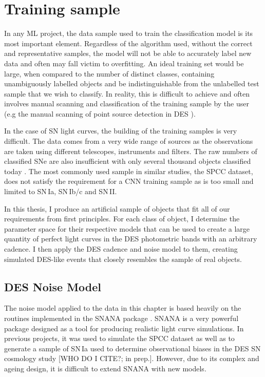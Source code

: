 \section{Training sample} \label{sec:TrainingSample}
In any ML project, the data sample used to train the classification model is its most important element. Regardless of the algorithm used, without the correct and representative samples, the model will not be able to accurately label new data and often may fall victim to overfitting. An ideal training set would be large, when compared to the number of distinct classes, containing unambiguously labelled objects and be indistinguishable from the unlabelled test sample that we wish to classify. In reality, this is difficult to achieve and often involves manual scanning and classification of the training sample by the user (e.g the manual scanning of point source detection in DES \citep[][and similar studies]{Goldstein2015}).

In the case of SN light curves, the building of the training samples is very difficult. The data comes from a very wide range of sources as the observations are taken using different telescopes, instruments and filters. The raw numbers of classified SNe are also insufficient with only several thousand objects classified today \citep{Alsabti2017}. The most commonly used sample in similar studies, the SPCC dataset, does not satisfy the requirement for a CNN training sample as is too small and limited to SN\,Ia, SN\,Ib/c and SN\,II.

In this thesis, I produce an artificial sample of objects that fit all of our requirements from first principles. For each class of object, I determine the parameter space for their respective models that can be used to create a large quantity of perfect light curves in the DES photometric bands with an arbitrary cadence. I then apply the DES cadence and noise model to them, creating simulated DES-like events that closely resembles the sample of real objects.

\subsection{DES Noise Model} \label{sec:NoiseModel}
The noise model applied to the data in this chapter is based heavily on the routines implemented in the SNANA package \citep{Kessler2009}. SNANA is a very powerful package designed as a tool for producing realistic light curve simulations. In previous projects, it was used to simulate the SPCC dataset \citep{Kessler2010} as well as to generate a sample of SN\,Ia used to determine observational biases in the DES SN cosmology study [WHO DO I CITE?; in prep.]. However, due to its complex and ageing design, it is difficult to extend SNANA with new models.

